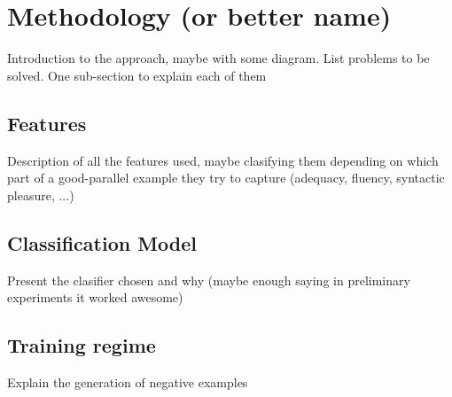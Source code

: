 \section{Methodology (or better name)}
Introduction to the approach, maybe with some diagram. List problems to be solved. One sub-section to explain each of them

\subsection{Features}
Description of all the features used, maybe clasifying them depending on which part of a good-parallel example they try to capture (adequacy, fluency, syntactic pleasure, ...)

\subsection{Classification Model}
Present the clasifier chosen and why (maybe enough saying in preliminary experiments it worked awesome)

\subsection{Training regime}
Explain the generation of negative examples
\cite{Hainan17}
